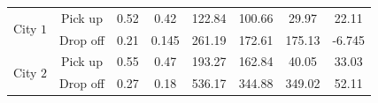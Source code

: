 \begin{table}[!h]
\begin{tabular}{|c|c|c|c|c|c|c|c|}
\multirow{2}{*}{City $1$}            & Pick up                         & 0.52                                                                   & 0.42                                                                                 & 122.84                                                                 & 100.66                                                                               & 29.97                                                                   & 22.11                                                                               \\ \cline{2-8} 
                               & Drop off                        & 0.21                                                                   & 0.145                                                                                & 261.19                                                                 & 172.61                                                                               & 175.13                                                                  & -6.745                                                                              \\ \hline
\multirow{2}{*}{City $2$}           & Pick up                         & 0.55                                                                   & 0.47                                                                                 & 193.27                                                                 & 162.84                                                                               & 40.05                                                                   & 33.03                                                                               \\ \cline{2-8} 
                               & Drop off                        & 0.27                                                                   & 0.18                                                                                 & 536.17                                                                 & 344.88                                                                               & 349.02                                                                  & 52.11                                                                               \\ \hline
\end{tabular}
\label{table:results}
\end{table}



